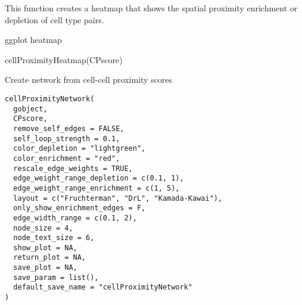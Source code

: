 \documentclass[a4paper]{book}
\begin{document}
%
\begin{Details}\relax
This function creates a heatmap that shows the  spatial proximity
enrichment or depletion of cell type pairs.
\end{Details}
%
\begin{Value}
ggplot heatmap
\end{Value}
%
\begin{Examples}
\begin{ExampleCode}
    cellProximityHeatmap(CPscore)
\end{ExampleCode}
\end{Examples}
%
\begin{Description}\relax
Create network from cell-cell proximity scores
\end{Description}
%
\begin{Usage}
\begin{verbatim}
cellProximityNetwork(
  gobject,
  CPscore,
  remove_self_edges = FALSE,
  self_loop_strength = 0.1,
  color_depletion = "lightgreen",
  color_enrichment = "red",
  rescale_edge_weights = TRUE,
  edge_weight_range_depletion = c(0.1, 1),
  edge_weight_range_enrichment = c(1, 5),
  layout = c("Fruchterman", "DrL", "Kamada-Kawai"),
  only_show_enrichment_edges = F,
  edge_width_range = c(0.1, 2),
  node_size = 4,
  node_text_size = 6,
  show_plot = NA,
  return_plot = NA,
  save_plot = NA,
  save_param = list(),
  default_save_name = "cellProximityNetwork"
)
\end{verbatim}
\end{Usage}
%
\end{document}
